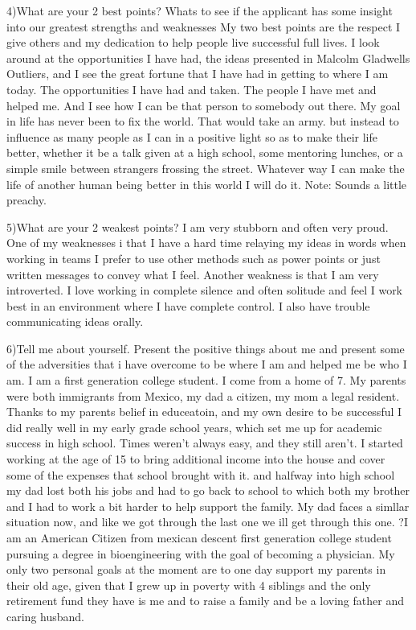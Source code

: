 \documentclass[12pt,a4paper,article]{memoir} %
\begin{document}
4)What are your 2 best points? Whats to see if the applicant has some insight into our greatest strengths and weaknesses
My two best points are the respect I give others and my dedication to help people live successful full lives.  I look around at the opportunities I have had, the ideas presented in Malcolm Gladwells Outliers, and I see the great fortune that I have had in getting to where I am today.  The opportunities I have had and taken.  The people I have met and helped me.  And I see how I can be that person to somebody out there.  My goal in life has never been to fix the world.  That would take an army.  but instead to influence as many people as I can in a positive light so as to make their life better, whether it be a talk given at a high school, some mentoring lunches, or a simple smile between strangers frossing the street.  Whatever way I can make the life of another human being better in this world I will do it.  Note: Sounds a little preachy.  

5)What are your 2 weakest points?
I am very stubborn and often very proud.  
One of my weaknesses i that I have a hard time relaying my ideas in words when working in teams I prefer to use other methods such as power points or just written messages to convey what I feel.  Another weakness is that I am very introverted.  I love working in complete silence and often solitude and feel I work best in an environment where I have complete control.
I also have trouble communicating ideas orally.  

6)Tell me about yourself. Present the positive things about me and present some of the adversities that i have overcome to be where I am and helped me be who I am.
I am a first generation college student. I come from a home of 7. My parents were both immigrants from Mexico, my dad a citizen, my mom a legal resident.  Thanks to my parents belief in educeatoin, and my own desire to be successful I did really well in my early grade school years, which set me up for academic success in high school.  Times weren't always easy, and they still aren't. I started working at the age of 15 to bring additional income into the house and cover some of the expenses that school brought with it.  and halfway into high school my dad lost both his jobs and had to go back to school to which both my brother and I had to work a bit harder to help support the family.  My dad faces a simllar situation now, and like we got through the last one we ill get through this one. ?I am an American Citizen from mexican descent first generation college student pursuing a degree in bioengineering with the goal of becoming a physician.  My only two personal goals at the moment are to one day support my parents in their old age, given that I grew up in poverty with 4 siblings and the only retirement fund they have is me and to raise a family and be a loving father and caring husband. 
\end{document}
